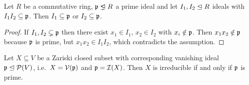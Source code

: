 % 
% 




\begin{lemma}
  \label{lemma: trivial prime avoidance}
  Let $R$ be a commutative ring, $\mf{p} \idealneq R$ a prime ideal and let $I_1, I_2 \trianglelefteq R$ ideals with $I_1 I_2 \subseteq \mathfrak{p}$.
  Then $I_1 \subseteq \mathfrak{p}$ or $I_2 \subseteq \mathfrak{p}$.
\end{lemma}

\begin{proof}
  If $I_1, I_2 \subsetneq \mathfrak{p}$ then there exist $x_1 \in I_1$, $x_2 \in I_2$ with $x_i \notin \mathfrak{p}$.
  Then $x_1 x_2 \notin \mathfrak{p}$ because $\mathfrak{p}$ is prime, but $x_1 x_2 \in I_1 I_2$, which contradicts the assumption.
\end{proof}


\begin{lemma}
  \label{lemma: X is irreducible iff I(X) is prime}
  Let $X \subseteq V$ be a Zariski closed subset with corresponding vanishing ideal $\mathfrak{p} \trianglelefteq \mathcal{P}(V)$, i.e.\ $X = \mathcal{V}(\mathfrak{p})$ and $\mathfrak{p} = \mathcal{I}(X)$.
  Then $X$ is irreducible if and only if $\mathfrak{p}$ is prime.
\end{lemma}


